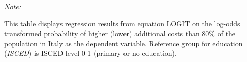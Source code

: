 \begin{table}[htbp!]
\begin{adjustbox}{width = 1\textwidth, max height = 0.95\textheight, center}
\begin{threeparttable}[b]
         \begin{tablenotes}\item \medskip \textit{Note:}
            \item This table displays regression results from equation LOGIT on the log-odds transformed probability of higher (lower) additional costs than 80\% of the population in Italy as the dependent variable. Reference group for education (\textit{ISCED}) is ISCED-level 0-1 (primary or no education).
         \end{tablenotes}
      \end{threeparttable}
   \end{adjustbox}
\end{table}


